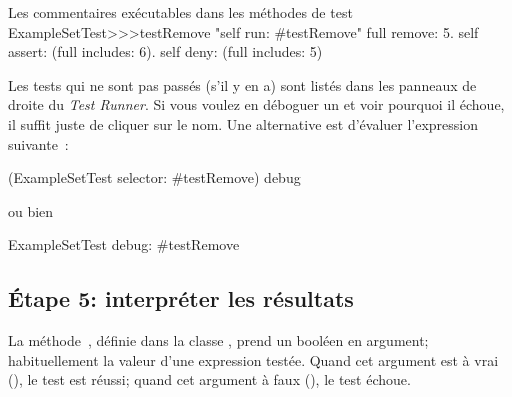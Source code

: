 \documentclass[a4paper,10pt,twoside]{book}
\begin{document}
\begin{method}[ExampleSetTestTestRemoveii]{Les commentaires exécutables dans les méthodes de test}
ExampleSetTest>>>testRemove
	"self run: #testRemove"
	full remove: 5.
	self assert: (full includes: 6).
	self deny: (full includes: 5)
\end{method}


Les tests qui ne sont pas passés (s'il y en a) sont listés dans les panneaux de droite du \emph{Test Runner}.
Si vous voulez en déboguer un et voir pourquoi il échoue, il suffit juste de cliquer sur le nom. 
Une alternative est d'évaluer l'expression suivante~:
\begin{code}{}
(ExampleSetTest selector: #testRemove) debug
\end{code}
ou bien
\begin{code}{}
ExampleSetTest debug: #testRemove
\end{code}


\subsection{\'Etape 5: interpréter les résultats}

La méthode \,, définie dans la classe , prend un booléen en argument; habituellement la valeur d'une expression testée. Quand cet argument est à vrai (), le test est réussi; quand cet argument à faux (), le test échoue.  
\end{document}
